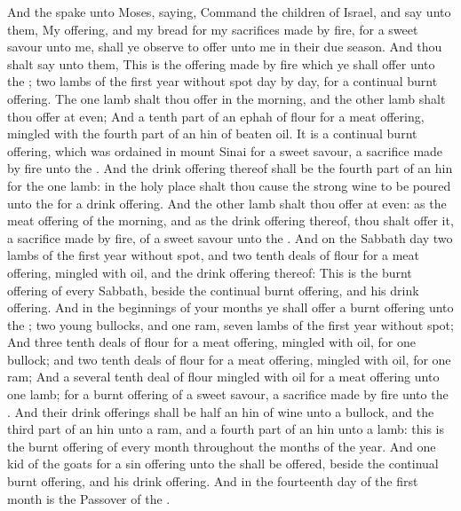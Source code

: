 \begin{biblechapter} %
 And the \LORD spake unto Moses, saying,
\verse Command the children of Israel, and say unto them, My offering, and my bread for my sacrifices made by fire, for a sweet savour unto me, shall ye observe to offer unto me in their due season.
\verse And thou shalt say unto them, This is the offering made by fire which ye shall offer unto the \LORD; two lambs of the first year without spot day by day, for a continual burnt offering.
\verse The one lamb shalt thou offer in the morning, and the other lamb shalt thou offer at even;
\verse And a tenth part of an ephah of flour for a meat offering, mingled with the fourth part of an hin of beaten oil.
\verse It is a continual burnt offering, which was ordained in mount Sinai for a sweet savour, a sacrifice made by fire unto the \LORD.
\verse And the drink offering thereof shall be the fourth part of an hin for the one lamb: in the holy place shalt thou cause the strong wine to be poured unto the \LORD for a drink offering.
\verse And the other lamb shalt thou offer at even: as the meat offering of the morning, and as the drink offering thereof, thou shalt offer it, a sacrifice made by fire, of a sweet savour unto the \LORD.
 And on the Sabbath day two lambs of the first year without spot, and two tenth deals of flour for a meat offering, mingled with oil, and the drink offering thereof:
\verse This is the burnt offering of every Sabbath, beside the continual burnt offering, and his drink offering.
 And in the beginnings of your months ye shall offer a burnt offering unto the \LORD; two young bullocks, and one ram, seven lambs of the first year without spot;
\verse And three tenth deals of flour for a meat offering, mingled with oil, for one bullock; and two tenth deals of flour for a meat offering, mingled with oil, for one ram;
\verse And a several tenth deal of flour mingled with oil for a meat offering unto one lamb; for a burnt offering of a sweet savour, a sacrifice made by fire unto the \LORD.
\verse And their drink offerings shall be half an hin of wine unto a bullock, and the third part of an hin unto a ram, and a fourth part of an hin unto a lamb: this is the burnt offering of every month throughout the months of the year.
\verse And one kid of the goats for a sin offering unto the \LORD shall be offered, beside the continual burnt offering, and his drink offering.
 And in the fourteenth day of the first month is the Passover of the \LORD.

\end{biblechapter}
